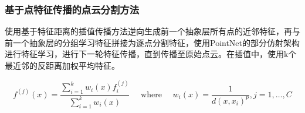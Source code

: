 \begin{frame}
\frametitle{基于点特征传播的点云分割方法}
    
使用基于特征距离的插值传播方法逆向生成前一个抽象层所有点的近邻特征，再与前一个抽象层的分组学习特征拼接为逐点分割特征，使用PointNet的部分仿射架构进行特征学习，进行下一轮特征传播，直到传播至原始点云。在插值中，使用k个最近邻的反距离加权平均特征。


$$
f^{(j)}(x)=\frac{\sum_{i=1}^{k} w_{i}(x) f_{i}^{(j)}}{\sum_{i=1}^{k} w_{i}(x)} \quad \text { where } \quad w_{i}(x)=\frac{1}{d\left(x, x_{i}\right)^{p}}, j=1, \dots, C
$$


\end{frame}
